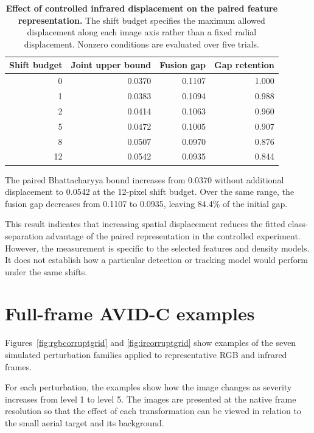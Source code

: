 \documentclass[10pt]{article}
\newcommand{\corrupt}{\textsc{AVID-C}}
\begin{document}
\begin{table}[h]
\centering
\caption{\textbf{Effect of controlled infrared displacement on the paired feature representation.}
The shift budget specifies the maximum allowed displacement along each image axis rather than a fixed radial displacement. Nonzero conditions are evaluated over five trials.}
\label{tab:alignsweep}
\small
\begin{tabular}{rrrr}
\toprule
Shift budget
& Joint upper bound
& Fusion gap
& Gap retention \\
\midrule
0  & 0.0370 & 0.1107 & 1.000 \\
1  & 0.0383 & 0.1094 & 0.988 \\
2  & 0.0414 & 0.1063 & 0.960 \\
5  & 0.0472 & 0.1005 & 0.907 \\
8  & 0.0507 & 0.0970 & 0.876 \\
12 & 0.0542 & 0.0935 & 0.844 \\
\bottomrule
\end{tabular}
\end{table}

The paired Bhattacharyya bound increases from 0.0370 without additional displacement to 0.0542 at the 12-pixel shift budget. Over the same range, the fusion gap decreases from 0.1107 to 0.0935, leaving 84.4\% of the initial gap.

This result indicates that increasing spatial displacement reduces the fitted class-separation advantage of the paired representation in the controlled experiment. However, the measurement is specific to the selected features and density models. It does not establish how a particular detection or tracking model would perform under the same shifts.


\section{Full-frame \corrupt{} examples}
\label{app:corruptionfigs}

Figures~\ref{fig:rgbcorruptgrid} and \ref{fig:ircorruptgrid} show examples of the seven simulated perturbation families applied to representative RGB and infrared frames.

For each perturbation, the examples show how the image changes as severity increases from level 1 to level 5. The images are presented at the native frame resolution so that the effect of each transformation can be viewed in relation to the small aerial target and its background.
\end{document}
